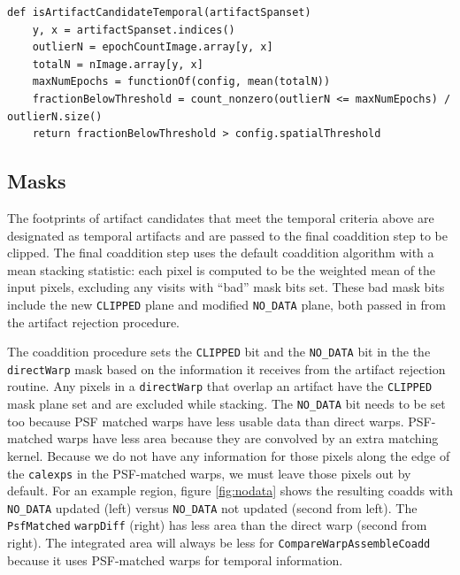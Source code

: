 \documentclass[DM,authoryear,toc]{lsstdoc}
\begin{document}
\begin{verbatim}
def isArtifactCandidateTemporal(artifactSpanset)
    y, x = artifactSpanset.indices()
    outlierN = epochCountImage.array[y, x]
    totalN = nImage.array[y, x]
    maxNumEpochs = functionOf(config, mean(totalN))
    fractionBelowThreshold = count_nonzero(outlierN <= maxNumEpochs) / outlierN.size()
    return fractionBelowThreshold > config.spatialThreshold
\end{verbatim}



\subsection{Masks}
\label{sec:masks}
The footprints of artifact candidates that meet the temporal criteria above are designated as temporal artifacts and are passed to the final coaddition step to be clipped.
The final coaddition step uses the default coaddition algorithm with a mean stacking statistic: each pixel is computed to be the weighted mean of the input pixels, excluding any visits with ``bad'' mask bits set.
These bad mask bits include the new \texttt{CLIPPED} plane and modified \texttt{NO\_DATA} plane, both passed in from the artifact rejection procedure.

The coaddition procedure sets the \texttt{CLIPPED} bit and the  \texttt{NO\_DATA} bit in the the \texttt{directWarp} mask  based on the information it receives from the artifact rejection routine.
Any pixels in a \texttt{directWarp} that overlap an artifact have the \texttt{CLIPPED} mask plane set and are excluded while stacking.
The  \texttt{NO\_DATA} bit needs to be set too because PSF matched warps  have less usable data than direct warps.
PSF-matched warps have less area because they are convolved by an extra matching kernel.
Because we do not have any information for those pixels along the edge of the \texttt{calexps} in the PSF-matched warps, we must leave those pixels out by default.
For an example region, figure \ref{fig:nodata} shows the resulting coadds with \texttt{NO\_DATA} updated (left) versus \texttt{NO\_DATA} not updated (second from left).
The \texttt{PsfMatched} \texttt{warpDiff} (right)  has less area than the direct warp (second from right).
The integrated area will always be less for  \texttt{CompareWarpAssembleCoadd} because it uses PSF-matched warps for temporal information.
\end{document}
